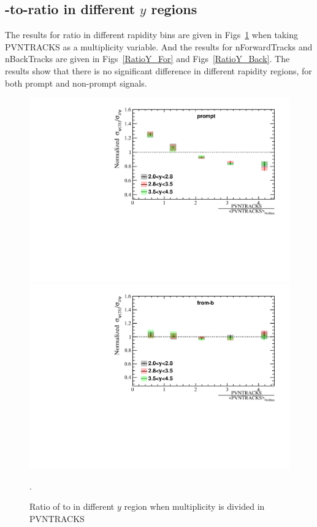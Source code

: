 \subsection{\psitwos-to-\jpsi ratio in different $y$ regions}
The results for ratio in different rapidity bins are given in Figs~\ref{RatioY} when taking PVNTRACKS as a multiplicity variable. And the results for nForwardTracks and nBackTracks are given in Figs~\ref{RatioY_For} and Figs~\ref{RatioY_Back}. The results show that there is no significant difference in different rapidity regions, for both prompt and non-prompt signals.
\begin{figure}[H]
  \begin{center}
    \includegraphics[width=0.48\linewidth]{pdf/Result/promptRatioY.pdf}
    \includegraphics[width=0.48\linewidth]{pdf/Result/frombRatioY.pdf}
  \end{center}
  \caption{Ratio of \psitwos to \jpsi in different $y$ region when multiplicity is divided in PVNTRACKS}.
  \label{RatioY}
\end{figure}

